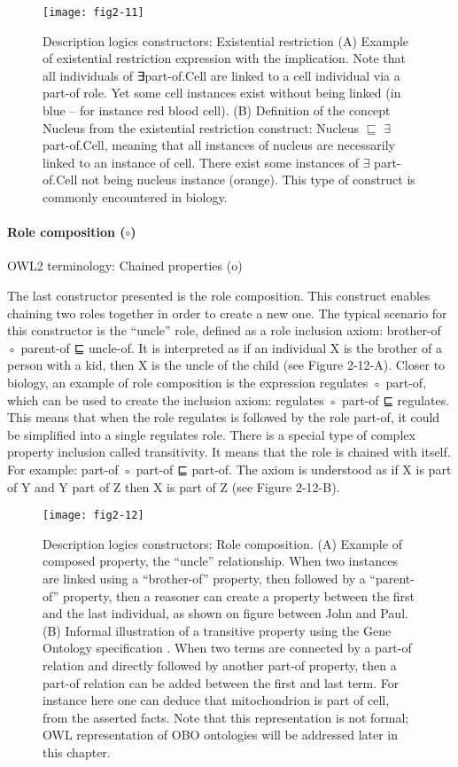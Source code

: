 \begin{figure}[H]
    \centering
    \texttt{[image: fig2-11]}
    \caption{Description logics constructors: Existential restriction (A) Example of existential restriction expression with the implication. Note that all individuals of ∃part-of.Cell are linked to a cell individual via a part-of role. Yet some cell instances exist without being linked (in blue – for instance red blood cell). (B) Definition of the concept Nucleus from the existential restriction construct: Nucleus $ \sqsubseteq $ $ \exists $ part-of.Cell, meaning that all instances of nucleus are necessarily linked to an instance of cell. There exist some instances of $ \exists $ part-of.Cell not being nucleus instance (orange). This type of construct is commonly encountered in biology.}
    \label{fig2-11}
\end{figure}

\paragraph{\textbf{Role composition ($ \circ $)}\\}
OWL2 terminology: Chained properties (o)

The last constructor presented is the role composition. This construct enables chaining two roles together in order to create a new one. The typical scenario for this constructor is the “uncle” role, defined as a role inclusion axiom: brother-of ◦ parent-of ⊑ uncle-of. It is interpreted as if an individual X is the brother of a person with a kid, then X is the uncle of the child (see Figure 2-12-A). Closer to biology, an example of role composition is the expression regulates ◦ part-of, which can be used to create the inclusion axiom: regulates ◦ part-of ⊑ regulates. This means that when the role regulates is followed by the role part-of, it could be simplified into a single regulates role. There is a special type of complex property inclusion called transitivity. It means that the role is chained with itself. For example: part-of ◦ part-of ⊑ part-of. The axiom is understood as if X is part of Y and Y part of Z then X is part of Z (see Figure 2-12-B).

\begin{figure}[ht]
    \centering
    \texttt{[image: fig2-12]}
    \caption{Description logics constructors: Role composition. (A) Example of composed property, the “uncle” relationship. When two instances are linked using a “brother-of” property, then followed by a “parent-of” property, then a reasoner can create a property between the first and the last individual, as shown on figure between John and Paul. (B) Informal illustration of a transitive property using the Gene Ontology specification \citep{gorels}. When two terms are connected by a part-of relation and directly followed by another part-of property, then a part-of relation can be added between the first and last term. For instance here one can deduce that mitochondrion is part of cell, from the asserted facts. Note that this representation is not formal; OWL representation of OBO ontologies will be addressed later in this chapter.}
    \label{fig2-12}
\end{figure}

